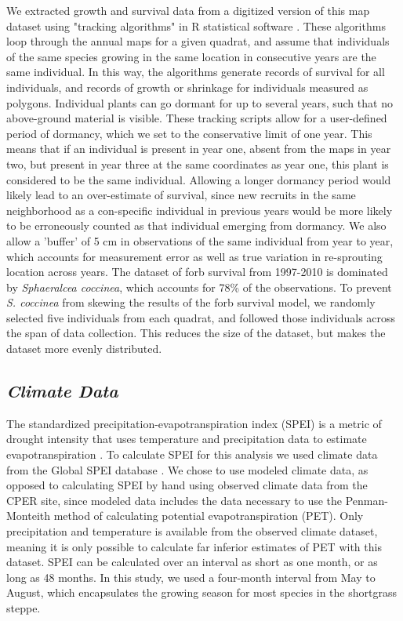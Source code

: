 \documentclass[12pt, letterpaper]{article}
\begin{document}
We extracted growth and survival data from a digitized version of this map dataset using "tracking algorithms" in R statistical software \cite{Lauenroth2008, RCoreTeam2019}. These algorithms loop through the annual maps for a given quadrat, and assume that individuals of the same species growing in the same location in consecutive years are the same individual. In this way, the algorithms generate records of survival for all individuals, and records of growth or shrinkage for individuals measured as polygons. Individual plants can go dormant for up to several years, such that no above-ground material is visible. These tracking scripts allow for a user-defined period of dormancy, which we set to the conservative limit of one year. This means that if an individual is present in year one, absent from the maps in year two, but present in year three at the same coordinates as year one, this plant is considered to be the same individual. Allowing a longer dormancy period would likely lead to an over-estimate of survival, since new recruits in the same neighborhood as a con-specific individual in previous years would be more likely to be erroneously counted as that individual emerging from dormancy. We also allow a 'buffer' of 5 cm in observations of the same individual from year to year, which accounts for measurement error as well as true variation in re-sprouting location across years. The dataset of forb survival from 1997-2010 is dominated by \textit{Sphaeralcea coccinea}, which accounts for 78\% of the observations. To prevent \textit{S. coccinea} from skewing the results of the forb survival model, we randomly selected five individuals from each quadrat, and followed those individuals across the span of data collection. This reduces the size of the dataset, but makes the dataset more evenly distributed.

\subsection{\textit{Climate Data}} The standardized precipitation-evapotranspiration index (SPEI) is a metric of drought intensity that uses temperature and precipitation data to estimate evapotranspiration . To calculate SPEI for this analysis we used climate data from the Global SPEI database \cite{Vicente-Serrano2010}. We chose to use modeled climate data, as opposed to calculating SPEI by hand using observed climate data from the CPER site, since modeled data includes the data necessary to use the Penman-Monteith method of calculating potential evapotranspiration (PET). Only precipitation and temperature is available from the observed climate dataset, meaning it is only possible to calculate far inferior estimates of PET with this dataset. SPEI can be calculated over an interval as short as one month, or as long as 48 months. In this study, we used a four-month interval from May to August, which encapsulates the growing season for most species in the shortgrass steppe. 
\end{document}
